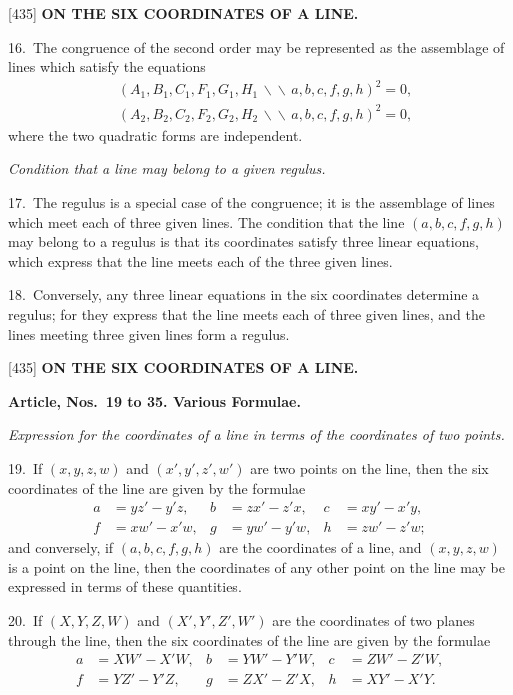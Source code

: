 \documentclass[12pt,a4paper]{article}
\newcommand{\paperref}[1]{\textup{[#1]}}
\theoremstyle{definition}
\begin{document}
\newpage
\setcounter{page}{73}

\noindent\paperref{435}\quad
\textbf{ON THE SIX COORDINATES OF A LINE.}

16.~The congruence of the second order may be represented as the assemblage of lines which satisfy the equations
\begin{align*}
&(A_1, B_1, C_1, F_1, G_1, H_1 \,\backslash\!\!\backslash\, a, b, c, f, g, h)^2 = 0,\\
&(A_2, B_2, C_2, F_2, G_2, H_2 \,\backslash\!\!\backslash\, a, b, c, f, g, h)^2 = 0,
\end{align*}
where the two quadratic forms are independent.

\textit{Condition that a line may belong to a given regulus.}

17.~The regulus is a special case of the congruence; it is the assemblage of lines which meet each of three given lines. The condition that the line $(a, b, c, f, g, h)$ may belong to a regulus is that its coordinates satisfy three linear equations, which express that the line meets each of the three given lines.

18.~Conversely, any three linear equations in the six coordinates determine a regulus; for they express that the line meets each of three given lines, and the lines meeting three given lines form a regulus.

\newpage
\setcounter{page}{74}

\noindent\paperref{435}\quad
\textbf{ON THE SIX COORDINATES OF A LINE.}

\smallskip
\textbf{Article, Nos.~19 to 35. Various Formulae.}

\smallskip
\textit{Expression for the coordinates of a line in terms of the coordinates of two points.}

19.~If $(x, y, z, w)$ and $(x', y', z', w')$ are two points on the line, then the six coordinates of the line are given by the formulae
\begin{align*}
a &= y z' - y' z, & b &= z x' - z' x, & c &= x y' - x' y,\\
f &= x w' - x' w, & g &= y w' - y' w, & h &= z w' - z' w;
\end{align*}
and conversely, if $(a, b, c, f, g, h)$ are the coordinates of a line, and $(x, y, z, w)$ is a point on the line, then the coordinates of any other point on the line may be expressed in terms of these quantities.

20.~If $(X, Y, Z, W)$ and $(X', Y', Z', W')$ are the coordinates of two planes through the line, then the six coordinates of the line are given by the formulae
\begin{align*}
a &= X W' - X' W, & b &= Y W' - Y' W, & c &= Z W' - Z' W,\\
f &= Y Z' - Y' Z, & g &= Z X' - Z' X, & h &= X Y' - X' Y.
\end{align*}
\end{document}
